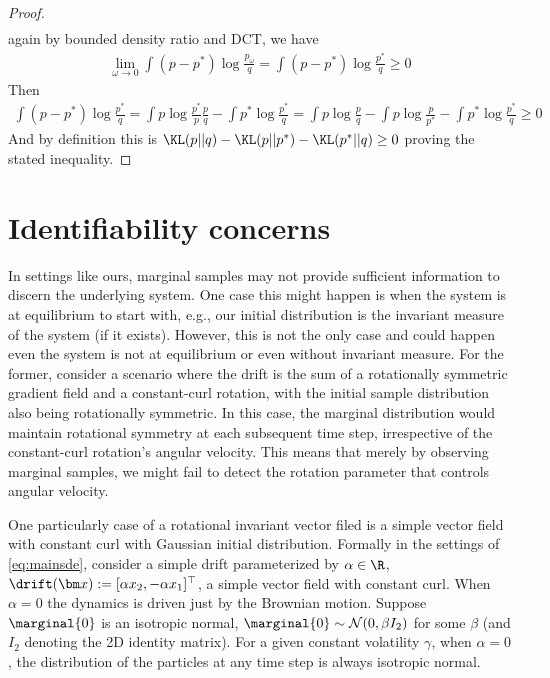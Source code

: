 \begin{proof}
\begin{align*}
    \end{align*}
    again by bounded density ratio and DCT, we have 
    \begin{align*}
        \lim_{\omega \to 0}\int (p-p^*)\log \frac{p_{\omega}}{q} = \int (p-p^*)\log \frac{p^*}{q}\ge 0
    \end{align*}
    Then 
    \begin{align*}
        \int (p-p^*)\log \frac{p^*}{q}=\int p\log \frac{p^*}{p}\frac{p}{q}-\int p^* \log \frac{p^*}{q}=\int p\log \frac{p}{q} - \int p\log \frac{p}{p^*}-\int p^* \log \frac{p^*}{q}\ge 0
    \end{align*}
    And by definition this is $\KL(p||q)-\KL(p||p^*)-\KL(p^*||q)\ge 0$ proving the stated inequality. 
\end{proof}


\section{Identifiability concerns}
\label{sec:identifiability}

In settings like ours, marginal samples may not provide sufficient information to discern the underlying system. One case this might happen is when the system is at equilibrium to start with, e.g., our initial distribution is the invariant measure of the system (if it exists). However, this is not the only case and could happen even the system is not at equilibrium or even without invariant measure. For the former, consider a scenario where the drift is the sum of a rotationally symmetric gradient field and a constant-curl rotation, with the initial sample distribution also being rotationally symmetric. In this case, the marginal distribution would maintain rotational symmetry at each subsequent time step, irrespective of the constant-curl rotation's angular velocity. This means that merely by observing marginal samples, we might fail to detect the rotation parameter that controls angular velocity. 


One particularly case of a rotational invariant vector filed is a simple vector field with constant curl with Gaussian initial distribution. Formally in the settings of \cref*{eq:mainsde}, consider a simple drift parameterized by $\alpha\in \R$, $\drift(\bm x) := [\alpha x_2, -\alpha x_1]^\top$, a simple vector field with constant curl. When $\alpha=0$ the dynamics is driven just by the Brownian motion. Suppose $\marginal{0}$ is an isotropic normal, $\marginal{0} \sim \mathcal{N}(0, \beta I_2)$ for some $\beta$ (and $I_2$ denoting the 2D identity matrix). For a given constant volatility $\gamma$, when $\alpha=0$, the distribution of the particles at any time step is always isotropic normal. 

